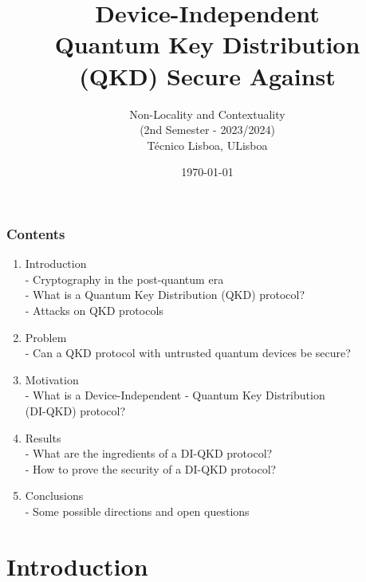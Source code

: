 \documentclass{beamer}
\title{{Device-Independent}\\{Quantum Key Distribution}\\{(QKD) Secure Against}\\\vspace{0.25ex}{Collective Attacks}}
\subtitle{Non-Locality and Contextuality\\ (2nd Semester - 2023/2024)\\\vspace{-0.75ex} T\'{e}cnico Lisboa, ULisboa}
\author[R.\,A.\,Barreiro]
{%
    \texorpdfstring{
        \begin{columns}
            \column{\linewidth}
            \centering
            {R\'{u}ben Andr\'{e} Barreiro}\\
            \href{mailto:ruben.andre.letra.barreiro@tecnico.ulisboa.pt}{\color{blue}\footnotesize ruben.andre.letra.barreiro@tecnico.ulisboa.pt}
        \end{columns}
    }
    {R\'{u}ben Andr\'{e} Barreiro}
}
\date{\today}
\begin{document}
	\setcounter{showProgressBar}{0}
	\setcounter{showSlideNumbers}{0}

	\frame{\titlepage}

	\begin{frame}
		\frametitle{Contents}
        
        \vspace{4.5ex}
		\begin{enumerate}
            \item Introduction \\ \textcolor{ExecusharesGrey}{\footnotesize\hspace{1em} - Cryptography in the post-quantum era\\\hspace{1em} - What is a Quantum Key Distribution (QKD) protocol?\\\vspace{-0.75ex}\hspace{1em} - Attacks on QKD protocols}
			\item Problem \\ \textcolor{ExecusharesGrey}{\footnotesize\hspace{1em} - Can a QKD protocol with untrusted quantum devices be secure?}
			\item Motivation \\ \textcolor{ExecusharesGrey}{\footnotesize\hspace{1em} - What is a Device-Independent - Quantum Key Distribution\\\hspace{1.5em} (DI-QKD) protocol?}
			\item Results \\ \textcolor{ExecusharesGrey}{\footnotesize\hspace{1em} - What are the ingredients of a DI-QKD protocol?\\\hspace{1em} - How to prove the security of a DI-QKD protocol?}
			\item Conclusions \\ \textcolor{ExecusharesGrey}{\footnotesize\hspace{1em} - Some possible directions and open questions}
		\end{enumerate}
	\end{frame}

	\setcounter{framenumber}{0}
	\setcounter{showProgressBar}{1}
	\setcounter{showSlideNumbers}{1}

    
	\section{Introduction}
 
\end{document}
